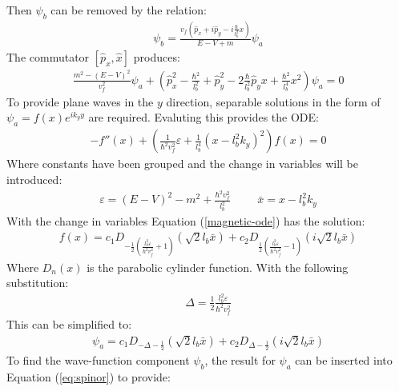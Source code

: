 				Then $\psi_{b}$ can be removed  by the relation:
				\begin{align}\label{eq:spinor}
					\psi_{b}=\frac{v_{f}\left(\hat{p}_{x}+i\hat{p}_{y}-i\frac{\hbar}{l_{b}^{2}}x\right)}{E-V+m}\psi_{a}
				\end{align}
				The commutator $[\hat{p}_{x},\hat{x}]$ produces:
				\begin{align}
					\frac{m^{2}-\left(E-V\right)^{2}}{v_{f}^{2}}\psi_{a}+\left(\hat{p}_{x}^{2}-\frac{\hbar^2}{l_{b}^{2}}+\hat{p}_{y}^{2}-2\frac{\hbar}{l_{b}^{2}}\hat{p}_{y}x+\frac{\hbar^{2}}{l_{b}^{4}}x^{2}\right)\psi_{a}=0
				\end{align}
				To provide plane waves in the $y$ direction, separable solutions in the form of $\psi_{a}=f(x)e^{ik_{y}y}$ are required. Evaluting this provides the ODE:
				\begin{align}
					-f''(x)+\left(\frac{1}{\hbar^{2} v_{f}^{2}}\varepsilon+\frac{1}{l_{b}^{4}}\left(x-l_{b}^{2}k_{y}\right)^{2}\right)f(x)=0
					\label{magnetic-ode}
				\end{align}
				Where constants have been grouped and the change in variables will be introduced:
				\begin{align}
					\varepsilon=\left(E-V\right)^{2}-m^{2}+\frac{\hbar^2 v_{f}^{2}}{l_{b}^{2}}\hspace{1cm}{\bar x}=x-l_{b}^{2} k_{y}
				\end{align}
				With the change in variables Equation (\ref{magnetic-ode}) has the solution:
				\begin{align}
					f(x)=c_{1}D_{-\frac{1}{2}\left(\frac{l_{b}^{2}\varepsilon}{\hbar^2 v_{f}^{2}}+1\right)}\left(\sqrt{2}l_{b}{\bar x}\right)+c_{2}D_{\frac{1}{2}\left(\frac{l_{b}^{2}\varepsilon}{\hbar^2 v_{f}^{2}}-1\right)}\left(i\sqrt{2}l_{b}{\bar x}\right)
				\end{align}
				Where $D_{n}\left(x\right)$ is the parabolic cylinder function. With the following substitution:
				\begin{align}
					\Delta=\frac{1}{2}\frac{l_{b}^{2}\varepsilon}{\hbar^2 v_{f}^{2}}
				\end{align}
				This can be simplified to:
				\begin{align}
					\psi_{a}=c_{1}D_{-\Delta-\frac{1}{2}}\left(\sqrt{2}l_{b}{\bar x}\right)+c_{2}D_{\Delta-\frac{1}{2}}\left(i\sqrt{2}l_{b}{\bar x}\right)
					\label{introduction-mag-a}
				\end{align}
				To find the wave-function component $\psi_{b}$, the result for $\psi_{a}$ can be inserted into Equation (\ref{eq:spinor}) to provide:
